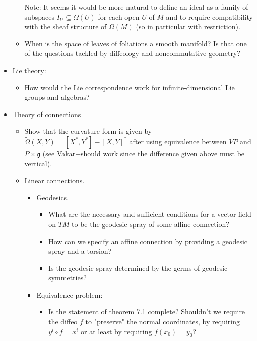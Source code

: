 \documentclass{report}
\theoremstyle{definition}
\begin{document}
\begin{itemize}
\begin{itemize}
        Note: It seems it would be more natural to define an ideal as a family of subspaces $I_U\subseteq\Omega(U)$ for each open $U$ of $M$ and to require compatibility with the sheaf structure of $\Omega(M)$ (so in particular with restriction).
        \item When is the space of leaves of foliations a smooth manifold? Is that one of the questions tackled by diffeology and noncommutative geometry?
    \end{itemize}
    \item Lie theory:
    \begin{itemize}
        \item How would the Lie correspondence work for infinite-dimensional Lie groups and algebras?
    \end{itemize}
    \item Theory of connections
    \begin{itemize}
        \item Show that the curvature form is given by $\tilde{\Omega}(X,Y)=[X^*,Y^*]-[X,Y]^*$ after using equivalence between $VP$ and $P\times\mathfrak{g}$ (see Vakar+should work since the difference given above must be vertical).
        \item Linear connections.
        \begin{itemize}
            \item Geodesics.
            \begin{itemize}
                \item What are the necessary and sufficient conditions for a vector field on $TM$ to be the geodesic spray of some affine connection?
                \item How can we specify an affine connection by providing a geodesic spray and a torsion?
                \item Is the geodesic spray determined by the germs of geodesic symmetries?
            \end{itemize}
            \item Equivalence problem:
            \begin{itemize}
                \item Is the statement of theorem 7.1 complete? Shouldn't we require the diffeo $f$ to "preserve" the normal coordinates, by requiring $y^i\circ f=x^i$ or at least by requiring $f(x_0)=y_0$?
            \end{itemize}
        \end{itemize}
    \end{itemize}

\end{itemize}
\end{document}
